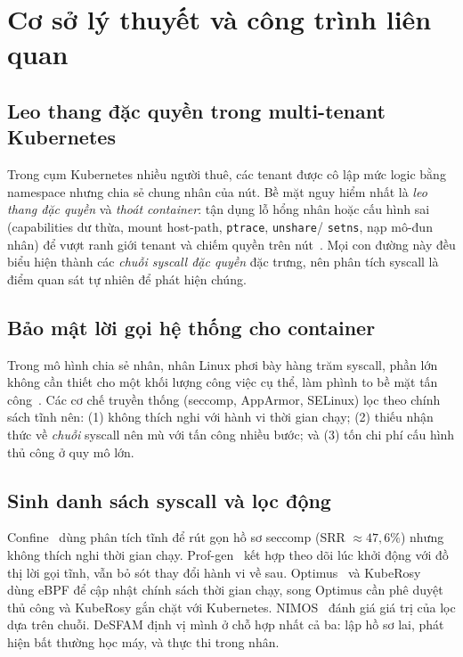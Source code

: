 \section{Cơ sở lý thuyết và công trình liên quan}
\label{sec:related}

\subsection{Leo thang đặc quyền trong multi-tenant Kubernetes}
Trong cụm Kubernetes nhiều người thuê, các tenant được cô lập mức logic bằng
namespace nhưng chia sẻ chung nhân của nút. Bề mặt nguy hiểm nhất là \emph{leo
thang đặc quyền} và \emph{thoát container}: tận dụng lỗ hổng nhân hoặc cấu hình
sai (capabilities dư thừa, mount host-path, \texttt{ptrace}, \texttt{unshare}/
\texttt{setns}, nạp mô-đun nhân) để vượt ranh giới tenant và chiếm quyền trên
nút~\cite{ref5_combe_docker}. Mọi con đường này đều biểu hiện thành các
\emph{chuỗi syscall đặc quyền} đặc trưng, nên phân tích syscall là điểm quan sát
tự nhiên để phát hiện chúng.

\subsection{Bảo mật lời gọi hệ thống cho container}
Trong mô hình chia sẻ nhân, nhân Linux phơi bày hàng trăm syscall, phần lớn không
cần thiết cho một khối lượng công việc cụ thể, làm phình to bề mặt tấn
công~\cite{ref11_shu_security}. Các cơ chế truyền thống (seccomp, AppArmor,
SELinux) lọc theo chính sách tĩnh nên: (1) không thích nghi với hành vi thời gian
chạy; (2) thiếu nhận thức về \emph{chuỗi} syscall nên mù với tấn công nhiều bước;
và (3) tốn chi phí cấu hình thủ công ở quy mô lớn.

\subsection{Sinh danh sách syscall và lọc động}
Confine~\cite{ref31_confine} dùng phân tích tĩnh để rút gọn hồ sơ seccomp (SRR
$\approx 47{,}6\%$) nhưng không thích nghi thời gian chạy.
Prof-gen~\cite{ref36_profgen} kết hợp theo dõi lúc khởi động với đồ thị lời gọi
tĩnh, vẫn bỏ sót thay đổi hành vi về sau. Optimus~\cite{ref27_optimus} và
KubeRosy~\cite{ref29_kuberosy} dùng eBPF để cập nhật chính sách thời gian chạy,
song Optimus cần phê duyệt thủ công và KubeRosy gắn chặt với Kubernetes.
NIMOS~\cite{ref38_nimos} đánh giá giá trị của lọc dựa trên chuỗi. DeSFAM định vị
mình ở chỗ hợp nhất cả ba: lập hồ sơ lai, phát hiện bất thường học máy, và thực
thi trong nhân.

